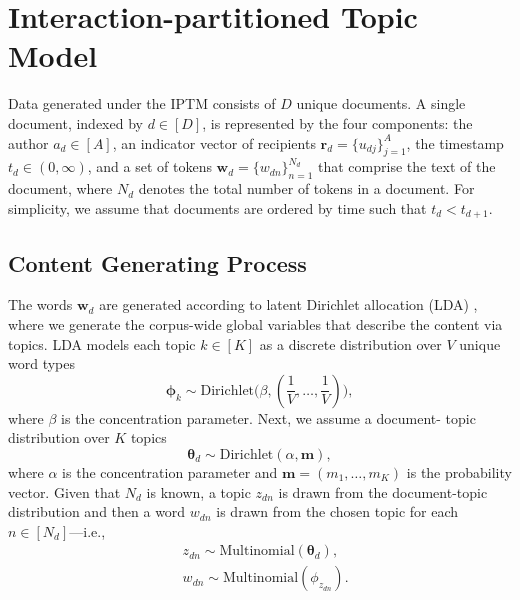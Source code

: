 \documentclass{article}
\begin{document}
\section{Interaction-partitioned Topic Model}\label{model definition}

Data generated under the IPTM consists of $D$ unique documents. A single document, indexed by $d \in [D]$, is represented by the four components: the author $a_d \in [A]$, an indicator vector of recipients $\boldsymbol{r}_d = \{u_{dj} \}_{j=1}^{A}$, the timestamp $t_d \in (0, \infty)$, and a set of tokens $\boldsymbol{w}_d= \{w_{dn} \}_{n=1}^{N_d}$ that comprise the text of the document, where $N_d$ denotes the total number of tokens in a document. For simplicity, we assume that documents are ordered by time such that $t_d < t_{d+1}$.


\subsection{Content Generating Process}\label{subsec:Content generating process}

The words $\boldsymbol{w}_d$ are generated according to latent Dirichlet allocation (LDA) \cite{Blei2003}, where we generate the corpus-wide global variables that describe the content via topics. LDA models each topic $k\in [K]$ as a discrete distribution over $V$ unique word types 
\begin{equation}
\boldsymbol{\phi}_k \sim \mbox{Dirichlet}\Big(\beta, (\frac{1}{V},\ldots,\frac{1}{V})\Big),
\end{equation}
where $\beta$ is the concentration parameter. Next, we assume a document- topic distribution over $K$ topics\\
\begin{equation}
\boldsymbol{\theta}_d \sim \mbox{Dirichlet}(\alpha, \boldsymbol{m}),
\end{equation}
where $\alpha$ is the concentration parameter and $\boldsymbol{m}=(m_1,\ldots,m_K)$ is the probability vector. Given that $N_d$ is known, a topic $z_{dn}$ is drawn from the document-topic distribution and then a word $w_{dn}$ is drawn from the chosen topic for each $n \in [N_d]$---i.e.,
\begin{equation}
\begin{aligned}
&z_{dn} \sim \mbox{Multinomial}(\boldsymbol{\theta}_d),\\
&w_{dn} \sim\mbox{Multinomial} (\phi_{z_{dn}}).
\end{aligned}
\end{equation}
\end{document}
